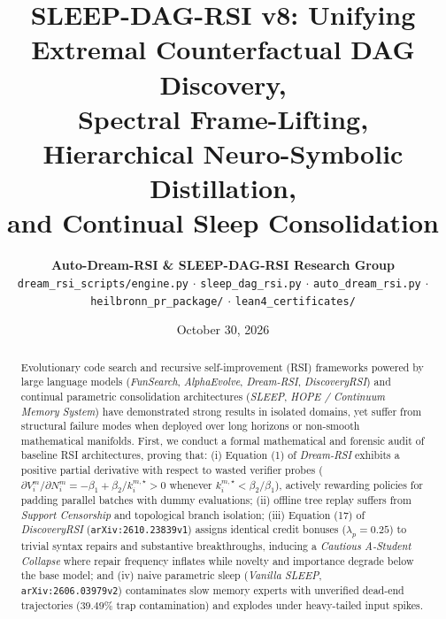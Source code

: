 \documentclass[11pt,a4paper]{article}
\title{\textbf{SLEEP-DAG-RSI v8: Unifying Extremal Counterfactual DAG Discovery,\\
Spectral Frame-Lifting, Hierarchical Neuro-Symbolic Distillation,\\
and Continual Sleep Consolidation}}
\author{\textbf{Auto-Dream-RSI \& SLEEP-DAG-RSI Research Group}\\
\texttt{dream\_rsi\_scripts/engine.py} $\cdot$ \texttt{sleep\_dag\_rsi.py} $\cdot$ \texttt{auto\_dream\_rsi.py} $\cdot$ \texttt{heilbronn\_pr\_package/} $\cdot$ \texttt{lean4\_certificates/}}
\date{October 30, 2026}
\begin{document}
\maketitle

\begin{abstract}
Evolutionary code search and recursive self-improvement (RSI) frameworks powered by large language models (\emph{FunSearch}, \emph{AlphaEvolve}, \emph{Dream-RSI}, \emph{DiscoveryRSI}) and continual parametric consolidation architectures (\emph{SLEEP}, \emph{HOPE / Continuum Memory System}) have demonstrated strong results in isolated domains, yet suffer from structural failure modes when deployed over long horizons or non-smooth mathematical manifolds. First, we conduct a formal mathematical and forensic audit of baseline RSI architectures, proving that: (i) Equation (1) of \emph{Dream-RSI} exhibits a positive partial derivative with respect to wasted verifier probes ($\partial V_i^m / \partial N_i^m = -\beta_1 + \beta_2 / k_i^{m,\star} > 0$ whenever $k_i^{m,\star} < \beta_2/\beta_1$), actively rewarding policies for padding parallel batches with dummy evaluations; (ii) offline tree replay suffers from \emph{Support Censorship} and topological branch isolation; (iii) Equation (17) of \emph{DiscoveryRSI} (\texttt{arXiv:2610.23839v1}) assigns identical credit bonuses ($\lambda_p = 0.25$) to trivial syntax repairs and substantive breakthroughs, inducing a \emph{Cautious A-Student Collapse} where repair frequency inflates while novelty and importance degrade below the base model; and (iv) naive parametric sleep (\emph{Vanilla SLEEP}, \texttt{arXiv:2606.03979v2}) contaminates slow memory experts with unverified dead-end trajectories ($39.49\%$ trap contamination) and explodes under heavy-tailed input spikes.


\end{abstract}
\end{document}
